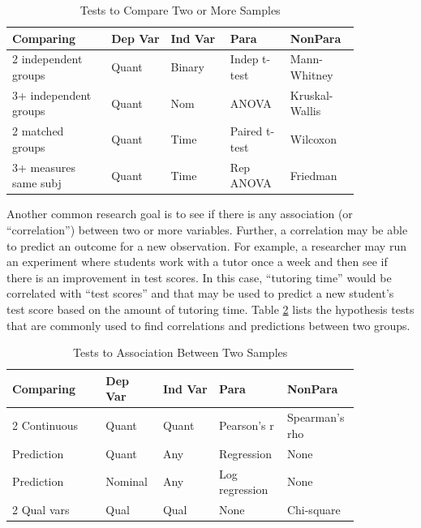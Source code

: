 \begin{table}[H]
	\centering
	\begin{tabularx}{0.95\linewidth}{p{0.25\linewidth}
			p{0.15\linewidth}
			p{0.15\linewidth}
			p{0.15\linewidth}
			p{0.15\linewidth}
		}
		\toprule
		\textbf{Comparing} & 
			\textbf{Dep Var} & 
			\textbf{Ind Var} &
			\textbf{Para} & 
			\textbf{NonPara} \\
		\midrule
		2 independent \newline groups & Quant & Binary & Indep t-test & Mann-Whitney \\
		3+ independent \newline groups & Quant & Nom & ANOVA & Kruskal-Wallis \\
		2 matched \newline groups & Quant & Time & Paired t-test & Wilcoxon \\	
		3+ measures \newline same subj & Quant & Time & Rep ANOVA & Friedman \\		

		\bottomrule
	\end{tabularx}
	\caption{Tests to Compare Two or More Samples}
	\label{tab06.07}
\end{table}

Another common research goal is to see if there is any association (or ``correlation'') between two or more variables. Further, a correlation may be able to predict an outcome for a new observation. For example, a researcher may run an experiment where students work with a tutor once a week and then see if there is an improvement in test scores. In this case, ``tutoring time'' would be correlated with ``test scores'' and that may be used to predict a new student's test score based on the amount of tutoring time. Table \ref{tab06.08} lists the hypothesis tests that are commonly used to find correlations and predictions between two groups.

\begin{table}[H]
	\centering
	\begin{tabularx}{0.95\linewidth}{p{0.25\linewidth}
			p{0.15\linewidth}
			p{0.15\linewidth}
			p{0.15\linewidth}
			p{0.15\linewidth}
		}
		\toprule
		\textbf{Comparing} & 
		\textbf{Dep Var} & 
		\textbf{Ind Var} &
		\textbf{Para} & 
		\textbf{NonPara} \\
		\midrule
		2 Continuous & Quant & Quant & Pearson's r & Spearman's rho \\
		Prediction & Quant & Any & Regression & None \\
		Prediction & Nominal & Any & Log \newline regression & None \\	
		2 Qual vars & Qual & Qual & None & Chi-square \\		
		
		\bottomrule
	\end{tabularx}
	\caption{Tests to Association Between Two Samples}
	\label{tab06.08}
\end{table}


